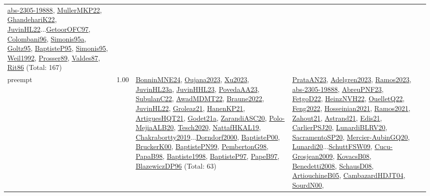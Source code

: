 {\begin{longtable}{p{3cm}r>{\raggedright\arraybackslash}p{6cm}>{\raggedright\arraybackslash}p{6cm}>{\raggedright\arraybackslash}p{8cm}}
\hyperref[detail:abs-2305-19888]{abs-2305-19888}, \hyperref[detail:MullerMKP22]{MullerMKP22}, \hyperref[detail:GhandehariK22]{GhandehariK22}, \hyperref[detail:JuvinHL22]{JuvinHL22}...\hyperref[detail:GetoorOFC97]{GetoorOFC97}, \hyperref[detail:Colombani96]{Colombani96}, \hyperref[detail:Simonis95a]{Simonis95a}, \hyperref[detail:Goltz95]{Goltz95}, \hyperref[detail:BaptisteP95]{BaptisteP95}, \hyperref[detail:Simonis95]{Simonis95}, \hyperref[detail:Weil1992]{Weil1992}, \hyperref[detail:Prosser89]{Prosser89}, \hyperref[detail:Valdes87]{Valdes87}, \hyperref[detail:Rit86]{Rit86} (Total: 167)\\
\index{preempt}\index{Concepts!preempt}preempt &  1.00 & \hyperref[detail:BonninMNE24]{BonninMNE24}, \hyperref[detail:Oujana2023]{Oujana2023}, \hyperref[detail:Xu2023]{Xu2023}, \hyperref[detail:JuvinHL23a]{JuvinHL23a}, \hyperref[detail:JuvinHHL23]{JuvinHHL23}, \hyperref[detail:PovedaAA23]{PovedaAA23}, \hyperref[detail:SubulanC22]{SubulanC22}, \hyperref[detail:AwadMDMT22]{AwadMDMT22}, \hyperref[detail:Braune2022]{Braune2022}, \hyperref[detail:JuvinHL22]{JuvinHL22}, \hyperref[detail:Groleaz21]{Groleaz21}, \hyperref[detail:HanenKP21]{HanenKP21}, \hyperref[detail:ArtiguesHQT21]{ArtiguesHQT21}, \hyperref[detail:Godet21a]{Godet21a}, \hyperref[detail:ZarandiASC20]{ZarandiASC20}, \hyperref[detail:Polo-MejiaALB20]{Polo-MejiaALB20}, \hyperref[detail:Tesch2020]{Tesch2020}, \hyperref[detail:NattafHKAL19]{NattafHKAL19}, \hyperref[detail:Chakrabortty2019]{Chakrabortty2019}...\hyperref[detail:Dorndorf2000]{Dorndorf2000}, \hyperref[detail:BaptisteP00]{BaptisteP00}, \hyperref[detail:BruckerK00]{BruckerK00}, \hyperref[detail:BaptistePN99]{BaptistePN99}, \hyperref[detail:PembertonG98]{PembertonG98}, \hyperref[detail:PapaB98]{PapaB98}, \hyperref[detail:Baptiste1998]{Baptiste1998}, \hyperref[detail:BaptisteP97]{BaptisteP97}, \hyperref[detail:PapeB97]{PapeB97}, \hyperref[detail:BlazewiczDP96]{BlazewiczDP96} (Total: 63) & \hyperref[detail:PrataAN23]{PrataAN23}, \hyperref[detail:Adelgren2023]{Adelgren2023}, \hyperref[detail:Ramos2023]{Ramos2023}, \hyperref[detail:abs-2305-19888]{abs-2305-19888}, \hyperref[detail:AbreuPNF23]{AbreuPNF23}, \hyperref[detail:FetgoD22]{FetgoD22}, \hyperref[detail:HeinzNVH22]{HeinzNVH22}, \hyperref[detail:OuelletQ22]{OuelletQ22}, \hyperref[detail:Feng2022]{Feng2022}, \hyperref[detail:Hosseinian2021]{Hosseinian2021}, \hyperref[detail:Ramos2021]{Ramos2021}, \hyperref[detail:Zahout21]{Zahout21}, \hyperref[detail:Astrand21]{Astrand21}, \hyperref[detail:Edis21]{Edis21}, \hyperref[detail:CarlierPSJ20]{CarlierPSJ20}, \hyperref[detail:LunardiBLRV20]{LunardiBLRV20}, \hyperref[detail:SacramentoSP20]{SacramentoSP20}, \hyperref[detail:Mercier-AubinGQ20]{Mercier-AubinGQ20}, \hyperref[detail:Lunardi20]{Lunardi20}...\hyperref[detail:SchuttFSW09]{SchuttFSW09}, \hyperref[detail:Cucu-Grosjean2009]{Cucu-Grosjean2009}, \hyperref[detail:KovacsB08]{KovacsB08}, \hyperref[detail:Benedetti2008]{Benedetti2008}, \hyperref[detail:SchausD08]{SchausD08}, \hyperref[detail:ArtiouchineB05]{ArtiouchineB05}, \hyperref[detail:CambazardHDJT04]{CambazardHDJT04}, \hyperref[detail:SourdN00]{SourdN00}, 
\end{longtable}}
